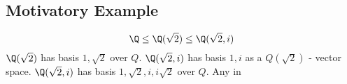 \documentclass{article}
\begin{document}
\subsection{Motivatory Example}
\begin{equation}
    \Q \leq \Q(\sqrt{2}) \leq \Q(\sqrt{2}, i)
\end{equation}
$\Q(\sqrt{2})$ has basis $1, \sqrt{2}$ over $Q$.
$\Q(\sqrt{2}, i)$ has basis $1, i$ as a $Q(\sqrt{2})$ - vector space.
$\Q(\sqrt{2}, i)$ has basis $1, \sqrt{2}, i, i\sqrt{2}$ over $Q$.
Any in
\end{document}
